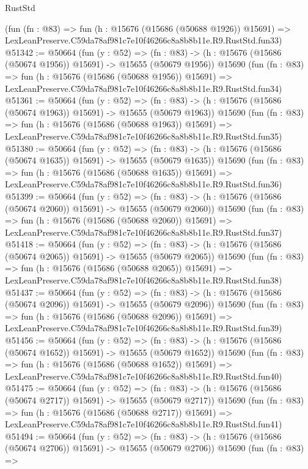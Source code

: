 \begin{lexlean}{RustStd}
\begin{coremodule}
    (fun (fn : @83) =>
    fun (h : @15676 (@15686 (@50688 @1926)) @15691) =>
    LexLeanPreserve.C59da78af981c7e10f46266c8a8b8b11e.R9.RustStd.fun33)
@51342 := @50664
    (fun (y : @52) =>
    (fn : @83) -> (h : @15676 (@15686 (@50674 @1956)) @15691) -> @15655 (@50679 @1956))
    @15690
    (fun (fn : @83) =>
    fun (h : @15676 (@15686 (@50688 @1956)) @15691) =>
    LexLeanPreserve.C59da78af981c7e10f46266c8a8b8b11e.R9.RustStd.fun34)
@51361 := @50664
    (fun (y : @52) =>
    (fn : @83) -> (h : @15676 (@15686 (@50674 @1963)) @15691) -> @15655 (@50679 @1963))
    @15690
    (fun (fn : @83) =>
    fun (h : @15676 (@15686 (@50688 @1963)) @15691) =>
    LexLeanPreserve.C59da78af981c7e10f46266c8a8b8b11e.R9.RustStd.fun35)
@51380 := @50664
    (fun (y : @52) =>
    (fn : @83) -> (h : @15676 (@15686 (@50674 @1635)) @15691) -> @15655 (@50679 @1635))
    @15690
    (fun (fn : @83) =>
    fun (h : @15676 (@15686 (@50688 @1635)) @15691) =>
    LexLeanPreserve.C59da78af981c7e10f46266c8a8b8b11e.R9.RustStd.fun36)
@51399 := @50664
    (fun (y : @52) =>
    (fn : @83) -> (h : @15676 (@15686 (@50674 @2060)) @15691) -> @15655 (@50679 @2060))
    @15690
    (fun (fn : @83) =>
    fun (h : @15676 (@15686 (@50688 @2060)) @15691) =>
    LexLeanPreserve.C59da78af981c7e10f46266c8a8b8b11e.R9.RustStd.fun37)
@51418 := @50664
    (fun (y : @52) =>
    (fn : @83) -> (h : @15676 (@15686 (@50674 @2065)) @15691) -> @15655 (@50679 @2065))
    @15690
    (fun (fn : @83) =>
    fun (h : @15676 (@15686 (@50688 @2065)) @15691) =>
    LexLeanPreserve.C59da78af981c7e10f46266c8a8b8b11e.R9.RustStd.fun38)
@51437 := @50664
    (fun (y : @52) =>
    (fn : @83) -> (h : @15676 (@15686 (@50674 @2096)) @15691) -> @15655 (@50679 @2096))
    @15690
    (fun (fn : @83) =>
    fun (h : @15676 (@15686 (@50688 @2096)) @15691) =>
    LexLeanPreserve.C59da78af981c7e10f46266c8a8b8b11e.R9.RustStd.fun39)
@51456 := @50664
    (fun (y : @52) =>
    (fn : @83) -> (h : @15676 (@15686 (@50674 @1652)) @15691) -> @15655 (@50679 @1652))
    @15690
    (fun (fn : @83) =>
    fun (h : @15676 (@15686 (@50688 @1652)) @15691) =>
    LexLeanPreserve.C59da78af981c7e10f46266c8a8b8b11e.R9.RustStd.fun40)
@51475 := @50664
    (fun (y : @52) =>
    (fn : @83) -> (h : @15676 (@15686 (@50674 @2717)) @15691) -> @15655 (@50679 @2717))
    @15690
    (fun (fn : @83) =>
    fun (h : @15676 (@15686 (@50688 @2717)) @15691) =>
    LexLeanPreserve.C59da78af981c7e10f46266c8a8b8b11e.R9.RustStd.fun41)
@51494 := @50664
    (fun (y : @52) =>
    (fn : @83) -> (h : @15676 (@15686 (@50674 @2706)) @15691) -> @15655 (@50679 @2706))
    @15690
    (fun (fn : @83) =>

\end{coremodule}
\end{lexlean}
